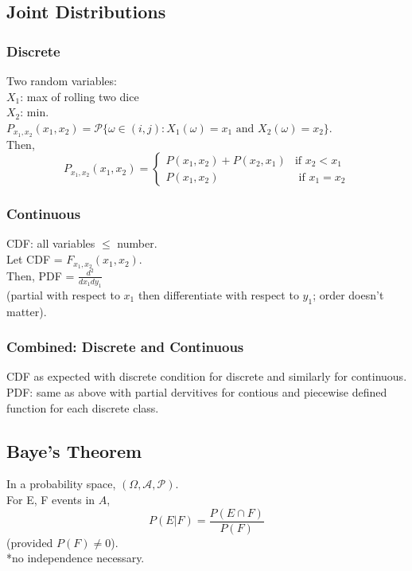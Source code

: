 \documentclass[12pt]{article}
\begin{document}
\subsection*{Joint Distributions}
\subsubsection*{Discrete}
Two random variables: \\
$X_1$: max of rolling two dice\\
$X_2$: min.\\

$P_{x_1, x_2} (x_1, x_2) = \mathcal{P} \{\omega \in (i, j): X_1(\omega) = x_1 \text{ and } X_2(\omega) = x_2\}$.\\

Then,
 \begin{displaymath}
    P_{x_1, x_2}(x_1, x_2) = \left\{
        \begin{array}{lr}
    P(x_1, x_2) + P(x_2, x_1) & \text{if } x_2 < x_1 \\
    P(x_1, x_2) & \text{ if } x_1 = x_2
    \end{array}
    \right.
\end{displaymath}



\subsubsection*{Continuous}

CDF: all variables $\leq$ number.\\

Let CDF = $F_{x_1, x_2}(x_1, x_2)$. \\
Then,
PDF = $\displaystyle \frac{d^2}{dx_1dy_1}$\\
(partial with respect to $x_1$ then differentiate with respect to $y_1$; order doesn't matter).

\subsubsection*{Combined: Discrete and Continuous}

CDF as expected with discrete condition for discrete and similarly for continuous.\\

PDF: same as above with partial dervitives for contious and piecewise defined function for each discrete class.

\subsection*{Baye's Theorem}
In a probability space, $(\Omega, \mathcal{A}, \mathcal{P})$. \\
For E, F events in $A$,
$$P(E | F) = \frac{P(E \cap F)}{P(F)}$$
(provided $P(F) \neq 0$).\\
*no independence necessary.\\
\end{document}
